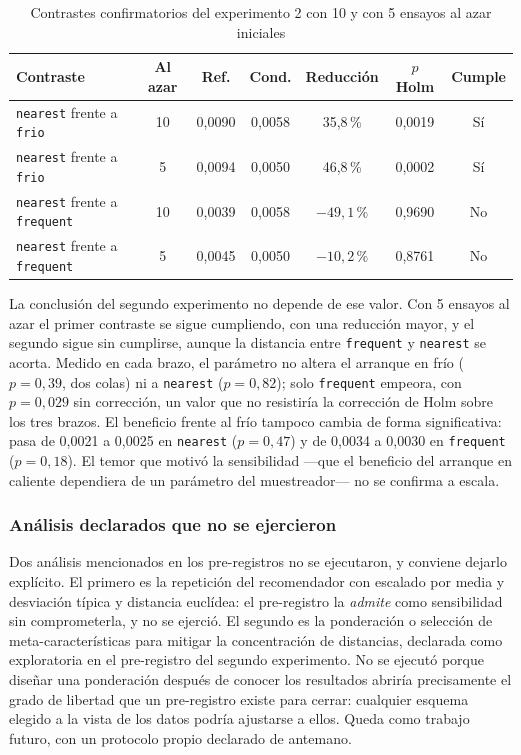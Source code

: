 \documentclass[12pt,letterpaper,oneside]{article}
\begin{document}
\begin{table}[H]
\centering
\small
\caption{Contrastes confirmatorios del experimento 2 con 10 y con 5 ensayos al azar iniciales}
\label{tab:sensibilidad}
\begin{tabularx}{\textwidth}{>{}L>{}C>{}C>{}C>{}C>{}C>{}C}
\toprule
\textbf{Contraste} & \textbf{Al azar} & \textbf{Ref.} & \textbf{Cond.} & \textbf{Reducción} &
\textbf{$p$ Holm} & \textbf{Cumple} \\
\midrule
\texttt{nearest} frente a \texttt{frio} & 10 & 0,0090 & 0,0058 & 35,8\,\% & 0,0019 & Sí \\
\texttt{nearest} frente a \texttt{frio} & 5 & 0,0094 & 0,0050 & 46,8\,\% & 0,0002 & Sí \\
\addlinespace
\texttt{nearest} frente a \texttt{frequent} & 10 & 0,0039 & 0,0058 & $-49{,}1$\,\% & 0,9690 &
No \\
\texttt{nearest} frente a \texttt{frequent} & 5 & 0,0045 & 0,0050 & $-10{,}2$\,\% & 0,8761 &
No \\
\bottomrule
\end{tabularx}
\end{table}

La conclusión del segundo experimento no depende de ese valor. Con 5 ensayos al azar el primer
contraste se sigue cumpliendo, con una reducción mayor, y el segundo sigue sin cumplirse,
aunque la distancia entre \texttt{frequent} y \texttt{nearest} se acorta. Medido en cada brazo,
el parámetro no altera el arranque en frío ($p = 0{,}39$, dos colas) ni a \texttt{nearest}
($p = 0{,}82$); solo \texttt{frequent} empeora, con $p = 0{,}029$ sin corrección, un valor que
no resistiría la corrección de Holm sobre los tres brazos. El beneficio frente al frío tampoco
cambia de forma significativa: pasa de 0,0021 a 0,0025 en \texttt{nearest} ($p = 0{,}47$) y de
0,0034 a 0,0030 en \texttt{frequent} ($p = 0{,}18$). El temor que motivó la sensibilidad ---que
el beneficio del arranque en caliente dependiera de un parámetro del muestreador--- no se
confirma a escala.

\subsubsection{Análisis declarados que no se ejercieron}
\label{sec:resultados-no-ejercidos}

Dos análisis mencionados en los pre-registros no se ejecutaron, y conviene dejarlo explícito.
El primero es la repetición del recomendador con escalado por media y desviación típica y
distancia euclídea: el pre-registro la \emph{admite} como sensibilidad sin comprometerla, y no
se ejerció. El segundo es la ponderación o selección de meta-características para mitigar la
concentración de distancias, declarada como exploratoria en el pre-registro del segundo
experimento. No se ejecutó porque diseñar una ponderación después de conocer los resultados
abriría precisamente el grado de libertad que un pre-registro existe para cerrar: cualquier
esquema elegido a la vista de los datos podría ajustarse a ellos. Queda como trabajo futuro,
con un protocolo propio declarado de antemano.
\end{document}

